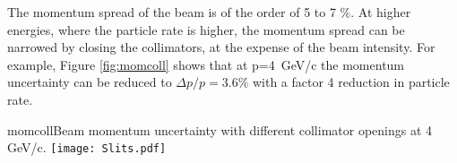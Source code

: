 The momentum spread of the beam is of the order of 5 to 7 \%. At higher energies, where
the particle rate is higher, the momentum spread  can be narrowed by
closing the collimators, at the expense of the beam intensity.  For example, Figure \ref{fig:momcoll} shows
that at p=4~GeV/c the momentum uncertainty can be  reduced to $\Delta p/p= 3.6\%$ with a factor 4 reduction in particle rate.  
\begin{cdrfigure}{momcoll}{Beam momentum uncertainty with different collimator openings at 4 GeV/c.}
  \texttt{[image: Slits.pdf]}
\end{cdrfigure}


